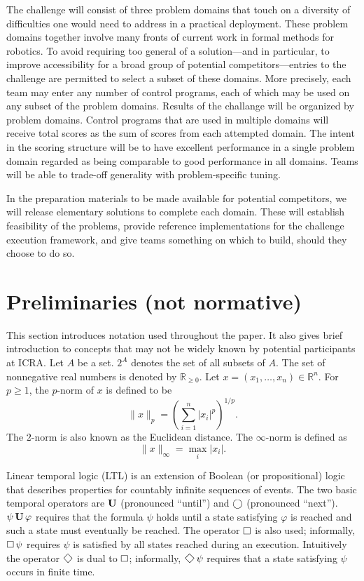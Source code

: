 \documentclass{amsart}
\theoremstyle{definition}
\begin{document}
The challenge will consist of three problem domains that touch on a diversity of
difficulties one would need to address in a practical deployment.  These problem
domains together involve many fronts of current work in formal methods for
robotics.  To avoid requiring too general of a solution---and in particular, to
improve accessibility for a broad group of potential competitors---entries to
the challenge are permitted to select a subset of these domains.  More
precisely, each team may enter any number of control programs, each of which may
be used on any subset of the problem domains.  Results of the challange will be
organized by problem domains.  Control programs that are used in multiple
domains will receive total scores as the sum of scores from each attempted
domain.  The intent in the scoring structure will be to have excellent
performance in a single problem domain regarded as being comparable to good
performance in all domains.  Teams will be able to trade-off generality with
problem-specific tuning.

In the preparation materials to be made available for potential competitors, we
will release elementary solutions to complete each domain.  These will establish
feasibility of the problems, provide reference implementations for the challenge
execution framework, and give teams something on which to build, should they
choose to do so.


\section{Preliminaries (not normative)}

This section introduces notation used throughout the paper.  It also gives brief
introduction to concepts that may not be widely known by potential participants
at ICRA.  Let $A$ be a set.  $2^A$ denotes the set of all subsets of $A$.  The
set of nonnegative real numbers is denoted by $\mathbb{R}_{\geq 0}$.  Let
$x=(x_1 , \ldots, x_n )\in \mathbb{R}^n$.  For $p \geq 1$, the $p$-norm of $x$
is defined to be
\begin{equation}
\lVert x \rVert_{p} = \left( \sum_{i=1}^{n}\lvert x_i \rvert^{p} \right)^{1/p} .
\end{equation}
The $2$-norm is also known as the Euclidean distance.  The $\infty$-norm is
defined as
\begin{equation}
\lVert x \rVert_{\infty} = \max_{i}\lvert x_i \rvert .
\end{equation}

Linear temporal logic (LTL) is an extension of Boolean (or propositional) logic
that describes properties for countably infinite sequences of events.  The two
basic temporal operators are $\operatorname{\mathbf{U}}$ (pronounced ``until'') and $\operatorname{\bigcirc}$
(pronounced ``next''). $\psi \operatorname{\mathbf{U}} \varphi$ requires that the formula $\psi$
holds until a state satisfying $\varphi$ is reached and such a state must
eventually be reached.  The operator $\operatorname{\Box}$ is also used; informally,
$\operatorname{\Box} \psi$ requires $\psi$ is satisfied by all states reached during an
execution.  Intuitively the operator $\Feventually$ is dual to $\operatorname{\Box}$;
informally, $\Feventually \psi$ requires that a state satisfying $\psi$ occurs
in finite time.
\end{document}

